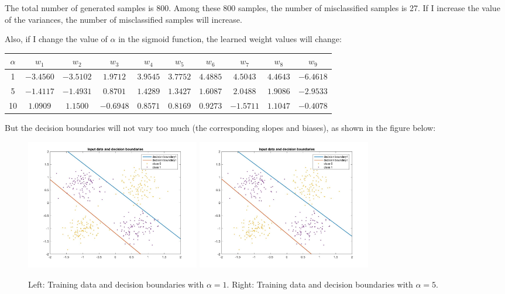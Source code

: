\documentclass[a4paper]{article}
\begin{document}
\begin{spacing}{2.0}
\begin{itemize}
The total number of generated samples is 800. Among these 800 samples, the number of misclassified samples is 27. If I increase the value of the variances, the number of misclassified samples will increase.

Also, if I change the value of $\alpha$ in the sigmoid function, the learned weight values will change:
\begin{table}[htbp]
\centering
\begin{tabular}{|c|c|c|c|c|c|c|c|c|c|}
\hline
$\alpha$ & $w_1$ &$w_2$ & $w_3$ & $w_4$ &$w_5$ & $w_6$ & $w_7$ &$w_8$ & $w_9$\\
\hline
1 & $-3.4560$ & $-3.5102$ & $1.9712$ & $3.9545$ & $3.7752$ & $4.4885$ & $4.5043$ &$4.4643$ & $-6.4618$\\ 
\hline
5 & $-1.4117$ &$-1.4931$ & $0.8701$ & $1.4289$ &$1.3427$ & $1.6087$ & $2.0488$ &$1.9086$ & $-2.9533$\\
\hline
10 & $1.0909$ & $1.1500$ & $-0.6948$ & $0.8571$ & $0.8169$ & $0.9273$ & $-1.5711$ & $1.1047$ & $-0.4078$\\
\hline
\end{tabular}
\end{table}
But the decision boundaries will not vary too much (the corresponding slopes and biases), as shown in the figure below:
\begin{figure}[H]
\centering
\includegraphics[width = 3in]{inputDB1.jpg}
\includegraphics[width = 3in]{inputDB5.jpg}
\caption{Left: Training data and decision boundaries with $\alpha = 1$. Right: Training data and decision boundaries with $\alpha = 5$.}
\label{inputDB_test16nearest}
\end{figure}


\end{itemize}
\end{spacing}
\end{document}
